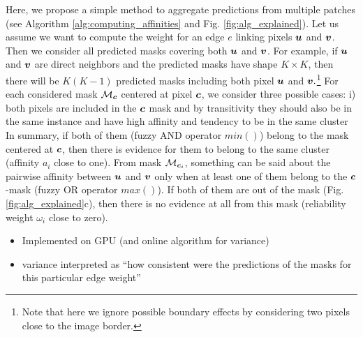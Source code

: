Here, we propose a simple method to aggregate predictions from multiple patches (see Algorithm \ref{alg:computing_affinities} and Fig. \ref{fig:alg_explained}). Let us assume we want to compute the weight for an edge $e$ linking pixels $\coord{u}$ and $\coord{v}$. Then we consider all predicted \maskname masks covering both $\coord{u}$ and $\coord{v}$. For example, if $\coord{u}$ and $\coord{v}$ are direct neighbors and the predicted masks have shape $K\times K$, then there will be $K(K-1)$ predicted masks including both pixel $\coord{u}$ and $\coord{v}.$\footnote{Note that here we ignore possible boundary effects by considering two pixels close to the image border.} 
For each considered mask $\mathcal{M}_{\coord{c}}$ centered at pixel $\coord{c}$, we consider three possible cases: i) both pixels are included in the $\coord{c}$ \maskname mask and by transitivity they should also be in the same instance and have high affinity and tendency to be in the same cluster
In summary, if both of them (fuzzy AND operator $min()$) belong to the mask centered at $\coord{c}$, then there is evidence for them to belong to the same cluster (affinity $a_i$ close to one). 
From mask $\mathcal{M}_{\coord{c}_i}$, something can be said about the pairwise affinity between $\coord{u}$ and $\coord{v}$ only when at least one of them belong to the $\coord{c}$-\maskname mask (fuzzy OR operator $max()$). If both of them are out of the mask (Fig. \ref{fig:alg_explained}c), then there is no evidence at all from this mask (reliability weight $\omega_i$ close to zero).

\begin{itemize}
\item Implemented on GPU (and online algorithm for variance)
\item variance interpreted as ``how consistent were the predictions of the masks for this particular edge weight''

\end{itemize}





